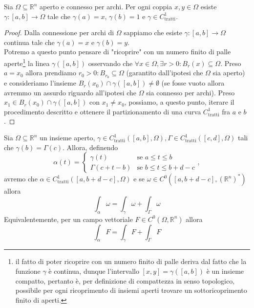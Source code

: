 \begin{lemma}
	Sia $\Omega \subseteq \mathbb{R}^n$ aperto e connesso per archi. Per ogni coppia $x, y \in \Omega$ esiste $\gamma:[a, b] \to \Omega$ tale che $\gamma(a) = x$, $\gamma(b)=1$ e $\gamma \in C^1_\text{tratti}$.
\end{lemma}
\begin{proof}
	Dalla connessione per archi di $\Omega$ sappiamo che esiste $\gamma: [a, b] \to \Omega$ continua tale che $\gamma(a) = x$ e $\gamma(b) = y$. \\
	Potremo a questo punto pensare di "ricoprire" con un numero finito di palle aperte\footnote{il fatto di poter ricoprire con un numero finito di palle deriva dal fatto che la funzione $\gamma$ è continua, dunque l'intervallo $[x,y] = \gamma([a, b])$ è un insieme compatto, pertanto è, per definizione di compattezza in senso topologico, possibile per ogni ricoprimento di insiemi aperti trovare un sottoricoprimento finito di aperti.} la linea $\gamma([a, b])$ osservando che $\forall x \in \Omega, \exists r > 0: B_r(x) \subseteq \Omega$. Preso $a = x_0$ allora prendiamo $r_0 > 0: B_{r_0} \subseteq \Omega$ (garantito dall'ipotesi che $\Omega$ sia aperto) e consideriamo l'insieme
	$B_r(x_0) \cap \gamma([a, b]) \neq \emptyset$ (se fosse vuoto allora avremmo un assurdo riguardo all'ipotesi che $\Omega$ sia connesso per archi). Preso $x_1 \in B_r(x_0) \cap \gamma([a, b])$ con $x_1 \neq x_0$, possiamo, a questo punto, iterare il procedimento descritto e ottenere il partizionamento di una curva $C^1_\text{tratti}$ fra $a$ e $b$.
\end{proof}
\begin{prop}
Sia $\Omega \subseteq \mathbb{R}^n$ un insieme aperto, $\gamma \in C^1_{\text{tratti}}([a, b], \Omega), \Gamma \in C^1_{\text{tratti}}([c, d], \Omega)$ tali che $\gamma(b) = \Gamma(c)$. Allora, definendo 
$$
\alpha(t) = \begin{cases} \gamma(t) & \text{se } a \leq t \leq b \\ \Gamma(c + t - b) & \text{se } b \leq t \leq b + d -c \end{cases},
$$
avremo che $\alpha \in C^1_\text{tratti}([a, b + d -c], \Omega)$ e se $\omega \in C^0([a, b  + d - c], (\mathbb{R}^n)^*)$ allora
$$
\int_\alpha \omega = \int_\gamma \omega + \int_\Gamma \omega
$$
Equivalentemente, per un campo vettoriale $F \in C^0(\Omega, \mathbb{R}^n)$ allora
$$
\int_\alpha F = \int_\gamma F + \int_\Gamma F
$$
\label{prop:somma_curve}
\end{prop}
